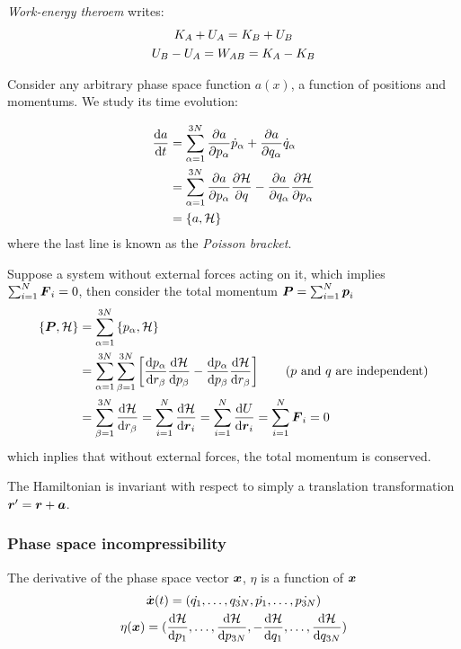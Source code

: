 \textit{Work-energy theroem} writes:
\begin{gather}
	K_A+U_A=K_B+U_B \notag\\
	U_B-U_A=W_{AB}=K_A-K_B
\end{gather}

Consider any arbitrary phase space function $a(x)$, a function of positions and momentums. We study its time evolution:
\begin{tcolorbox}
	\begin{align}
		\dfrac{\mathrm{d} a}{\mathrm{d} t}&=\sum_{\alpha=1}^{3N}\dfrac{\partial a}{\partial p_\alpha}\dot{p}_\alpha+\dfrac{\partial a}{\partial q_\alpha}\dot{q}_\alpha \notag\\
		&=\sum_{\alpha=1}^{3N}\dfrac{\partial a}{\partial p_\alpha}\dfrac{\partial \mathcal{H}}{\partial q}-\dfrac{\partial a}{\partial q_\alpha}\dfrac{\partial \mathcal{H}}{\partial p_\alpha}\\
		&=\left\{a,\mathcal{H}\right\} \label{eq:poisson-bracket}
	\end{align}
	where the last line is known as the \textit{Poisson bracket}.
\end{tcolorbox}

\example Suppose a system without external forces acting on it, which implies $\sum_{i=1}^N \boldsymbol{F}_i=0$, then consider the total momentum $\boldsymbol{P}=\sum_{i=1}^N\boldsymbol{p}_i$
\begin{align*}
	\left\{\boldsymbol{P},\mathcal{H}\right\}&=\sum_{\alpha=1}^{3N}\left\{p_\alpha,\mathcal{H}\right\}\\
	&=\sum_{\alpha=1}^{3N}\sum_{\beta=1}^{3N}\left[\dfrac{\mathrm{d} p_\alpha}{\mathrm{d} r_\beta}\dfrac{\mathrm{d} \mathcal{H}}{\mathrm{d} p_\beta}-\dfrac{\mathrm{d} p_\alpha}{\mathrm{d} p_\beta}\dfrac{\mathrm{d} \mathcal{H}}{\mathrm{d} r_\beta}\right] \qquad\text{($p$ and $q$ are independent)}\\
	&=\sum_{\beta=1}^{3N}\dfrac{\mathrm{d} \mathcal{H}}{\mathrm{d} r_\beta}=\sum_{i=1}^N\dfrac{\mathrm{d} \mathcal{H}}{\mathrm{d} \boldsymbol{r}_i}=\sum_{i=1}^N\dfrac{\mathrm{d} U}{\mathrm{d} \boldsymbol{r}_i}=\sum_{i=1}^N\boldsymbol{F}_i=0
\end{align*}
which inplies that without external forces, the total momentum is conserved.

The Hamiltonian is invariant with respect to simply a translation transformation $\boldsymbol{r}^\prime=\boldsymbol{r}+\boldsymbol{a}$.

\subsubsection{Phase space incompressibility}
The derivative of the phase space vector $\boldsymbol{x}$, $\eta$ is a function of $\boldsymbol{x}$
\begin{gather}
	\dot{\boldsymbol{x}}(t)=\left(\dot{q_1},\dots,\dot{q_{3N}},\dot{p_1},\dots,\dot{p_{3N}}\right) \notag\\
	\eta(\boldsymbol{x})=(\dfrac{\mathrm{d} \mathcal{H}}{\mathrm{d} p_1},\dots,\dfrac{\mathrm{d} \mathcal{H}}{\mathrm{d} p_{3N}},-\dfrac{\mathrm{d} \mathcal{H}}{\mathrm{d} q_1},\dots,\dfrac{\mathrm{d} \mathcal{H}}{\mathrm{d} q_{3N}}) \label{eq:etax}
\end{gather}

